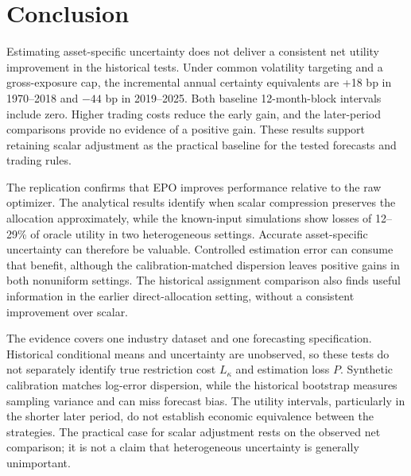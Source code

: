 \section{Conclusion}
Estimating asset-specific uncertainty does not deliver a consistent net utility improvement in the historical tests. Under common volatility targeting and a gross-exposure cap, the incremental annual certainty equivalents are +18 bp in 1970--2018 and $-44$ bp in 2019--2025. Both baseline 12-month-block intervals include zero. Higher trading costs reduce the early gain, and the later-period comparisons provide no evidence of a positive gain. These results support retaining scalar adjustment as the practical baseline for the tested forecasts and trading rules.

The replication confirms that EPO improves performance relative to the raw optimizer. The analytical results identify when scalar compression preserves the allocation approximately, while the known-input simulations show losses of 12--29\% of oracle utility in two heterogeneous settings. Accurate asset-specific uncertainty can therefore be valuable. Controlled estimation error can consume that benefit, although the calibration-matched dispersion leaves positive gains in both nonuniform settings. The historical assignment comparison also finds useful information in the earlier direct-allocation setting, without a consistent improvement over scalar.

The evidence covers one industry dataset and one forecasting specification. Historical conditional means and uncertainty are unobserved, so these tests do not separately identify true restriction cost $L_\kappa$ and estimation loss $P$. Synthetic calibration matches log-error dispersion, while the historical bootstrap measures sampling variance and can miss forecast bias. The utility intervals, particularly in the shorter later period, do not establish economic equivalence between the strategies. The practical case for scalar adjustment rests on the observed net comparison; it is not a claim that heterogeneous uncertainty is generally unimportant.

